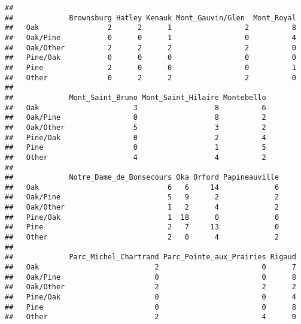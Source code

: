 \documentclass[
]{article}
\newenvironment{Shaded}{\begin{snugshade}}{\end{snugshade}}
\newcommand{\CommentTok}[1]{\textcolor[rgb]{0.56,0.35,0.01}{\textit{#1}}}
\newcommand{\FunctionTok}[1]{\textcolor[rgb]{0.13,0.29,0.53}{\textbf{#1}}}
\newcommand{\NormalTok}[1]{#1}
\newcommand{\OtherTok}[1]{\textcolor[rgb]{0.56,0.35,0.01}{#1}}
\newcommand{\SpecialCharTok}[1]{\textcolor[rgb]{0.81,0.36,0.00}{\textbf{#1}}}
\begin{document}
\begin{verbatim}
##            
##             Brownsburg Hatley Kenauk Mont_Gauvin/Glen  Mont_Royal
##   Oak                2      2      1                 2          8
##   Oak/Pine           0      0      1                 0          4
##   Oak/Other          2      2      2                 2          0
##   Pine/Oak           0      0      0                 0          0
##   Pine               2      0      0                 0          1
##   Other              0      2      2                 2          0
##            
##             Mont_Saint_Bruno Mont_Saint_Hilaire Montebello
##   Oak                      3                  8          6
##   Oak/Pine                 0                  8          2
##   Oak/Other                5                  3          2
##   Pine/Oak                 0                  2          4
##   Pine                     0                  1          5
##   Other                    4                  4          2
##            
##             Notre_Dame_de_Bonsecours Oka Orford Papineauville
##   Oak                              6   6     14             6
##   Oak/Pine                         5   9      2             2
##   Oak/Other                        1   2      4             2
##   Pine/Oak                         1  18      0             0
##   Pine                             2   7     13             0
##   Other                            2   0      4             2
##            
##             Parc_Michel_Chartrand Parc_Pointe_aux_Prairies Rigaud
##   Oak                           2                        0      7
##   Oak/Pine                      0                        0      8
##   Oak/Other                     2                        2      2
##   Pine/Oak                      0                        0      4
##   Pine                          0                        0      8
##   Other                         2                        4      0
\end{verbatim}

\begin{Shaded}
\end{Shaded}
\end{document}
